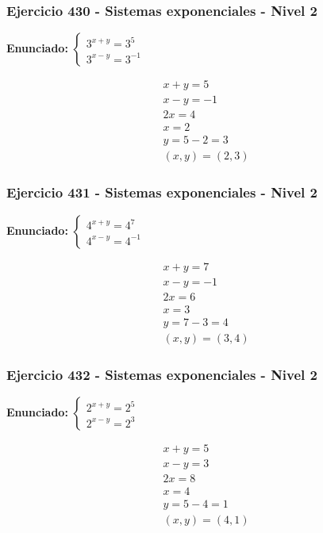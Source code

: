 \documentclass[12pt,a4paper]{article}
\begin{document}
\subsubsection*{Ejercicio 430 - Sistemas exponenciales - Nivel 2}
\textbf{Enunciado:} \(\begin{cases} 3^{x+y}=3^{5}\\ 3^{x-y}=3^{-1}\end{cases}\)

\[
\begin{aligned}
x+y=5\\
x-y=-1\\
2x=4\\
x=2\\
y=5-2=3\\
\boxed{(x,y)=(2,3)}
\end{aligned}
\]


\subsubsection*{Ejercicio 431 - Sistemas exponenciales - Nivel 2}
\textbf{Enunciado:} \(\begin{cases} 4^{x+y}=4^{7}\\ 4^{x-y}=4^{-1}\end{cases}\)

\[
\begin{aligned}
x+y=7\\
x-y=-1\\
2x=6\\
x=3\\
y=7-3=4\\
\boxed{(x,y)=(3,4)}
\end{aligned}
\]


\subsubsection*{Ejercicio 432 - Sistemas exponenciales - Nivel 2}
\textbf{Enunciado:} \(\begin{cases} 2^{x+y}=2^{5}\\ 2^{x-y}=2^{3}\end{cases}\)

\[
\begin{aligned}
x+y=5\\
x-y=3\\
2x=8\\
x=4\\
y=5-4=1\\
\boxed{(x,y)=(4,1)}
\end{aligned}
\]
\end{document}
